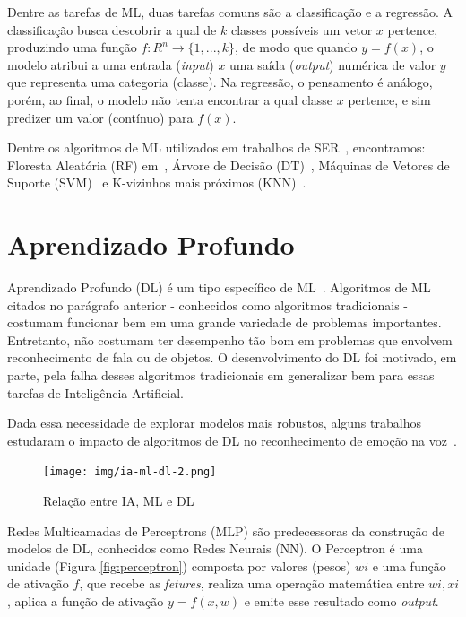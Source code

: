 Dentre as tarefas de \acrshort{ML}, duas tarefas comuns são a classificação e a regressão. A classificação busca descobrir a qual de $k$ classes possíveis um vetor $x$ pertence, produzindo uma função $f: R^n \rightarrow \{1, ..., k\}$, de modo que quando $y = f(x)$, o modelo atribui a uma entrada (\textit{input}) $x$ uma saída (\textit{output}) numérica de valor $y$ que representa uma categoria (classe). Na regressão, o pensamento é análogo, porém, ao final, o modelo não tenta encontrar a qual classe $x$ pertence, e sim predizer um valor (contínuo) para $f(x)$.

Dentre os algoritmos de \acrshort{ML} utilizados em trabalhos de \acrshort{SER}~\cite{20.7}, encontramos: Floresta Aleatória (\acrshort{RF}) em~\cite{20.10}, Árvore de Decisão (\acrshort{DT})~\cite{20.11}, Máquinas de Vetores de Suporte (\acrshort{SVM})~\cite{20.13} e K-vizinhos mais próximos (\acrshort{KNN})~\cite{20.15}.

\section{Aprendizado Profundo}\label{sec:dl}

Aprendizado Profundo (\acrshort{DL}) é um tipo específico de \acrshort{ML}~\cite{53}. Algoritmos de \acrshort{ML} citados no parágrafo anterior - conhecidos como algoritmos tradicionais - costumam funcionar bem em uma grande variedade de problemas importantes. Entretanto, não costumam ter desempenho tão bom em problemas que envolvem reconhecimento de fala ou de objetos. O desenvolvimento do \acrshort{DL} foi motivado, em parte, pela falha desses algoritmos tradicionais em generalizar bem para essas tarefas de Inteligência Artificial.

Dada essa necessidade de explorar modelos mais robustos, alguns trabalhos estudaram o impacto de algoritmos de \acrshort{DL} no reconhecimento de emoção na voz~\cite{12.12, 12.16}.

\begin{figure}[!h]
\centering
\texttt{[image: img/ia-ml-dl-2.png]}
\caption{\label{fig:ia-ml-dl}Relação entre \acrshort{IA}, \acrshort{ML} e \acrshort{DL}~\cite{img_iavsmlvsdl}}
\author{Fonte: Retirada de~\cite{58}}
\end{figure}

Redes Multicamadas de Perceptrons (\acrshort{MLP}) são predecessoras da construção de modelos de \acrshort{DL}, conhecidos como Redes Neurais (\acrlong{NN}). O Perceptron é uma unidade (Figura \ref{fig:perceptron}) composta por valores (pesos) $wi$ e uma função de ativação $f$,  que recebe as \textit{fetures}, realiza uma operação matemática entre $wi,xi$, aplica a função de ativação $y = f(x,w)$ e emite esse resultado como \textit{output}.

